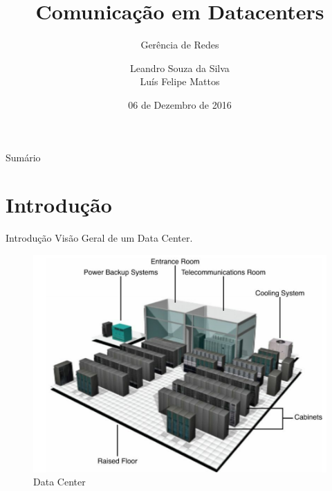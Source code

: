 \documentclass[aspectratio=169]{beamer}
\title{Comunicação em Datacenters}
\subtitle{Gerência de Redes}
\author[Leandro Silva, Luís Felipe] %
{Leandro Souza da  Silva \\ Luís Felipe Mattos}
\institute{IC - Unicamp}
\date{ 06 de Dezembro de 2016 }
\begin{document}
\begin{frame}
  \titlepage
\end{frame}

\begin{frame}{Sumário}
  \tableofcontents
\end{frame}


\section{Introdução}

    \begin{frame} {Introdução}
        \centering
        \Large Visão Geral de um Data Center.
        \begin{figure}[ht]    
            \includegraphics[scale=0.22]{datacenter.png}
            \caption{Data Center}
            \label{fig:data_center}
        \end{figure}

    \end{frame}
        
\end{document}
